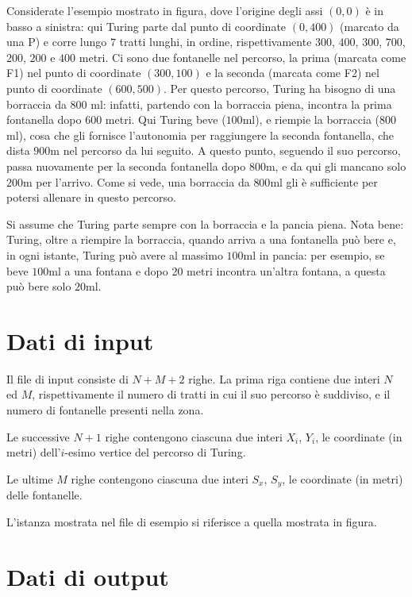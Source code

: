 \documentclass[a4paper,11pt]{article}
\begin{document}
Considerate l'esempio mostrato in figura, dove l'origine degli assi
$(0,0)$ è in basso a sinistra: qui Turing parte dal punto di coordinate
$(0,400)$ (marcato da una P) e corre lungo $7$ tratti lunghi, in ordine,
rispettivamente $300$, $400$, $300$, $700$, $200$, $200$ e $400$ metri.
Ci sono due fontanelle nel percorso, la prima (marcata come F1) nel
punto di coordinate $(300,100)$ e la seconda (marcata come F2) nel punto
di coordinate $(600,500)$. Per questo percorso, Turing ha bisogno di una
borraccia da $800$ ml: infatti, partendo con la borraccia piena,
incontra la prima fontanella dopo 600 metri. Qui Turing beve ($100$ml),
e riempie la borraccia ($800$ml), cosa che gli fornisce l'autonomia per
raggiungere la seconda fontanella, che dista $900$m nel percorso da lui
seguito. A questo punto, seguendo il suo percorso, passa nuovamente per
la seconda fontanella dopo $800$m, e da qui gli mancano solo $200$m per
l'arrivo. Come si vede, una borraccia da $800$ml gli è sufficiente per
potersi allenare in questo percorso. 
    
Si assume che Turing parte sempre con la borraccia e la pancia piena.
Nota bene: Turing, oltre a riempire la borraccia, quando arriva a una
fontanella può bere e, in ogni istante, Turing può avere al massimo
$100$ml in pancia: per esempio, se beve $100$ml a una fontana e dopo 20
metri incontra un'altra fontana, a questa può bere solo $20$ml. 
    

\section*{Dati di input}
  
Il file di input consiste di $N+M+2$ righe. La prima riga contiene due
interi $N$ ed $M$, rispettivamente il numero di tratti in cui il suo
percorso è suddiviso, e il numero di fontanelle presenti nella zona.
    
Le successive $N+1$ righe contengono ciascuna due interi $X_{i}$,
$Y_{i}$, le coordinate (in metri) dell'$i$-esimo vertice del percorso di
Turing.
    
Le ultime $M$ righe contengono ciascuna due interi $S_{x}$, $S_{y}$, le
coordinate (in metri) delle fontanelle.
    
L'istanza mostrata nel file di esempio si riferisce a quella mostrata in
figura.
    
\section*{Dati di output}
  
\end{document}
